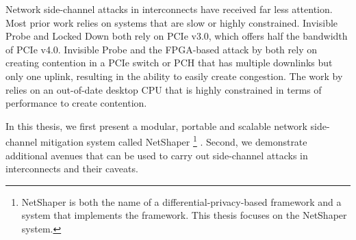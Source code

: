 Network side-channel attacks in interconnects have received far less attention.
Most prior work relies on systems that are slow or highly constrained.
Invisible Probe \cite{tan2021invisible} and Locked Down \cite{side2022lockeddown} both rely on PCIe v3.0, which offers half the bandwidth of PCIe v4.0.
Invisible Probe \cite{tan2021invisible} and the FPGA-based attack by \citet{giechaskiel2022cross} both rely on creating contention in a PCIe switch or PCH that has multiple downlinks but only one uplink, resulting in the ability to easily create congestion.
The work by \citet{khaliq2021timing} relies on an out-of-date desktop CPU that is highly constrained in terms of performance to create contention.

In this thesis, we first present a modular, portable and scalable network side-channel mitigation system called NetShaper 
\footnote{NetShaper is both the name of a differential-privacy-based framework and a system that implements the framework. This thesis focuses on the NetShaper system.} \cite{sabzi2024netshaper}.
Second, we demonstrate additional avenues that can be used to carry out side-channel attacks in interconnects and their caveats.


\begin{comment}


End-host modification (not scalable):
\cite{cai2014csbuflo, cherubin2017llama, luo2011httpos, smith2022qcsd, wang2017walkie}

Relies on only simulation or do not have any deployable implementation:
\cite{abusnaina2020dfd, beckerle2022splitting, cai2014tamaraw, gong2022surakav, hou2020wf, juarez2016wtfpad, nasr2021blind, rahman2020mockingbird, shan2021dolos, wang2014supersequence, wright2009morphing}

Not-adaptive to application requirements:
\cite{barradas2017deltashaper}

Not application agnostic:
\cite{cherubin2017llama, luo2011httpos}

Hard to deploy:
\cite{beckerle2022splitting, de2020trafficsliver}

\end{comment}